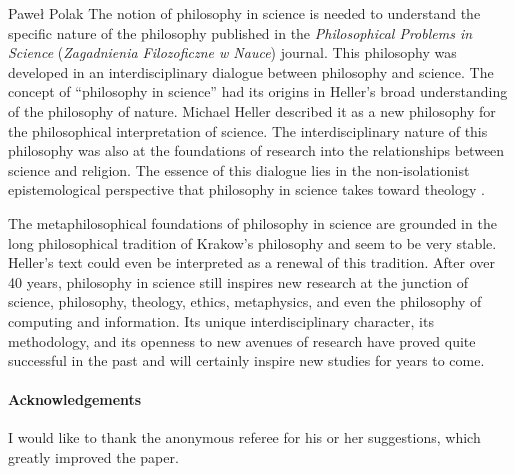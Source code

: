 \begin{artengenv}{Paweł Polak}
The notion of philosophy in science is needed to understand the specific nature of the philosophy published in the
\textit{Philosophical Problems in Science} (\textit{Zagadnienia Filozoficzne w Nauce}) journal. This philosophy was developed in
an interdisciplinary dialogue between philosophy and science. The concept of ``philosophy in science'' had its origins in
Heller’s broad understanding of the philosophy of nature. Michael Heller described it as a new philosophy for the
philosophical interpretation of science. The interdisciplinary nature of this philosophy was also at the foundations of
research into the relationships between science and religion. The essence of this dialogue lies in the non-isolationist
epistemological perspective that philosophy in science takes toward theology
\parencite{pol_polak_teologia_2015}.

The metaphilosophical foundations of philosophy in science are grounded in the long philosophical tradition of Krakow’s
philosophy and seem to be very stable. Heller’s text could even be interpreted as a renewal of this tradition. After
over 40 years, philosophy in science still inspires new research at the junction of science, philosophy, theology,
ethics, metaphysics, and even the philosophy of computing and information. Its unique interdisciplinary character, its
methodology, and its openness to new avenues of research have proved quite successful in the past and will certainly
inspire new studies for years to come.

\paragraph{Acknowledgements}
I would like to thank the anonymous referee for his or her suggestions, which greatly improved the paper.








\end{artengenv}\label{polak-stop}
